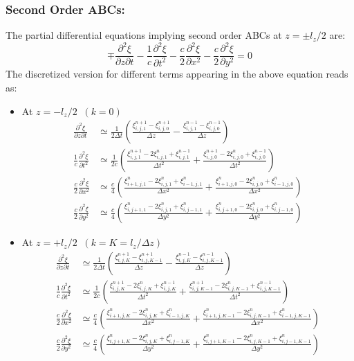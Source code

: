 \subsubsection{Second Order ABCs:}

The partial differential equations implying second order ABCs at $ z=\pm l_{z}/2 $ are:
%
\begin{equation}
\mp \frac{\partial^2 \xi}{\partial z \partial t} - \frac{1}{c}\frac{\partial^2 \xi}{\partial t^2} - \frac{c}{2}\frac{\partial^2 \xi}{\partial x^2} - \frac{c}{2}\frac{\partial^2 \xi}{\partial y^2}=0
\end{equation}
%
The discretized version for different terms appearing in the above equation reads as:
%
\begin{itemize}
\item At $z=-l_{z}/2 \; \; (k=0)$
\begin{align}
\frac{\partial^2 \xi}{\partial z \partial t} & \simeq \frac{1}{2 \Delta t } \left( \frac{\xi_{i,j,1}^{n+1}-\xi_{i,j,0}^{n+1}}{\Delta z}-\frac{\xi_{i,j,1}^{n-1}-\xi_{i,j,0}^{n-1}}{\Delta z} \right) \\
\frac{1}{c}\frac{\partial^2 \xi}{\partial t^2} & \simeq \frac{1}{2c} \left( \frac{\xi_{i,j,1}^{n+1}-2\xi_{i,j,1}^n+\xi_{i,j,1}^{n-1}}{\Delta t^2}+\frac{\xi_{i,j,0}^{n+1}-2\xi_{i,j,0}^n+\xi_{i,j,0}^{n-1}}{\Delta t^2} \right) \\
\frac{c}{2}\frac{\partial^2 \xi}{\partial x^2} & \simeq \frac{c}{4} \left( \frac{\xi_{i+1,j,1}^n-2\xi_{i,j,1}^n+\xi_{i-1,j,1}^n}{\Delta x^2}+\frac{\xi_{i+1,j,0}^n-2\xi_{i,j,0}^n+\xi_{i-1,j,0}^n}{\Delta x^2} \right) \\
\frac{c}{2}\frac{\partial^2 \xi}{\partial y^2} & \simeq \frac{c}{4} \left( \frac{\xi_{i,j+1,1}^n-2\xi_{i,j,1}^n+\xi_{i,j-1,1}^n}{\Delta y^2}+\frac{\xi_{i,j+1,0}^n-2\xi_{i,j,0}^n+\xi_{i,j-1,0}^n}{\Delta y^2} \right)
\end{align}
\item At $z=+l_{z}/2 \; \; (k=K=l_{z}/\Delta z)$
\begin{align}
\frac{\partial^2 \xi}{\partial z \partial t} & \simeq \frac{1}{2 \Delta t } \left( \frac{\xi_{i,j,K}^{n+1}-\xi_{i,j,K-1}^{n+1}}{\Delta z}-\frac{\xi_{i,j,K}^{n-1}-\xi_{i,j,K-1}^{n-1}}{\Delta z} \right)
\\
\frac{1}{c} \frac{\partial^2 \xi}{\partial t^2} & \simeq \frac{1}{2c} \left( \frac{\xi_{i,j,K}^{n+1}-2\xi_{i,j,K}^n+\xi_{i,j,K}^{n-1}}{\Delta t^2} + \frac{\xi_{i,j,K-1}^{n+1}-2\xi_{i,j,K-1}^n+\xi_{i,j,K-1}^{n-1}}{\Delta t^2} \right)
\\
\frac{c}{2}\frac{\partial^2 \xi}{\partial x^2} & \simeq \frac{c}{4} \left( \frac{\xi_{i+1,j,K}^n-2\xi_{i,j,K}^n+\xi_{i-1,j,K}^n}{\Delta x^2} + \frac{\xi_{i+1,j,K-1}^n-2\xi_{i,j,K-1}^n+\xi_{i-1,j,K-1}^n}{\Delta x^2} \right)
\\
\frac{c}{2}\frac{\partial^2 \xi}{\partial y^2} & \simeq \frac{c}{4} \left( \frac{\xi_{i,j+1,K}^n-2\xi_{i,j,K}^n+\xi_{i,j-1,K}^n}{\Delta y^2} + \frac{\xi_{i,j+1,K-1}^n-2\xi_{i,j,K-1}^n+\xi_{i,j-1,K-1}^n}{\Delta y^2} \right)
\end{align}
\end{itemize}
